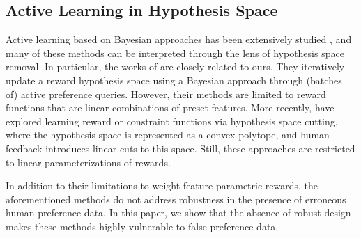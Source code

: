 \subsection{Active Learning in Hypothesis Space}
\vspace{-5pt}
Active learning based on Bayesian approaches has been extensively studied \cite{daniel2014active, biyik2018batch, Sadigh2017ActivePL, biyik2020active, houlsby2011bayesian, biyik2024batch}, and many of these methods can be interpreted through the lens of hypothesis space removal. In particular, the works of \cite{Sadigh2017ActivePL, biyik2018batch, biyik2024batch} are closely related to ours. They iteratively update a reward hypothesis space using a Bayesian approach through (batches of) active preference queries. However, their methods are limited to reward functions that are linear combinations of preset features. More recently, \cite{jin2022learning, xie2024safe} have explored learning reward or constraint functions via hypothesis space cutting, where the hypothesis space is represented as a convex polytope, and human feedback introduces linear cuts to this space. Still, these approaches are restricted to linear parameterizations of rewards.

In addition to their limitations to weight-feature parametric rewards, the aforementioned methods do not address robustness in the presence of erroneous human preference data. In this paper, we show that the absence of robust design makes these methods highly vulnerable to false preference data.